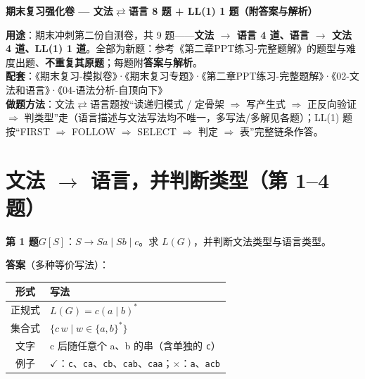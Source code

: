 \documentclass[12pt,a4paper,fontset=windows]{ctexart}
\newcommand{\ok}{\ensuremath{\checkmark}}
\newcommand{\bad}{\ensuremath{\times}}
\newcommand{\imp}{\ensuremath{\Rightarrow}}
\begin{document}
\begin{center}
{\LARGE\bfseries 期末复习强化卷 — 文法$\rightleftarrows$语言 8 题 + LL(1) 1 题（附答案与解析）}
\end{center}

\begin{infobox}
\textbf{用途}：期末冲刺第二份自测卷，共 9 题——\textbf{文法 $\to$ 语言 4 道、语言 $\to$ 文法 4 道、LL(1) 1 道}。全部为新题：参考《第二章PPT练习-完整题解》的题型与难度出题、\textbf{不重复其原题}；每题附\textbf{答案}与\textbf{解析}。\\
\textbf{配套}：《期末复习-模拟卷》·《期末复习专题》·《第二章PPT练习-完整题解》·《02-文法和语言》·《04-语法分析-自顶向下》\\
\textbf{做题方法}：文法$\rightleftarrows$语言题按``读递归模式 / 定骨架 \imp{} 写产生式 \imp{} 正反向验证 \imp{} 判类型''走（语言描述与文法写法均不唯一，多写法/多解见各题）；LL(1) 题按``FIRST \imp{} FOLLOW \imp{} SELECT \imp{} 判定 \imp{} 表''完整链条作答。
\end{infobox}

\section{\texorpdfstring{文法 $\to$ 语言，并判断类型（第 1--4 题）}{文法→语言，并判断类型（第 1–4 题）}}

\begin{qbox}
{\large\bfseries 第 1 题}\quad $G[S]$：$S \to Sa \mid Sb \mid c$。求 $L(G)$，并判断文法类型与语言类型。
\end{qbox}

\textbf{答案}（多种等价写法）：

\begin{center}
\renewcommand{\arraystretch}{1.25}
\begin{tabular}{c p{11.2cm}}
\toprule
\textbf{形式} & \textbf{写法} \\
\midrule
正规式 & $L(G)=c(a \mid b)^*$ \\
集合式 & $\{c\,w \mid w \in \{a,b\}^*\}$ \\
文字 & c 后随任意个 a、b 的串（含单独的 \texttt{c}） \\
例子 & \ok：\texttt{c}、\texttt{ca}、\texttt{cb}、\texttt{cab}、\texttt{caa}；\bad：\texttt{a}、\texttt{acb} \\
\bottomrule
\end{tabular}
\end{center}
\end{document}
